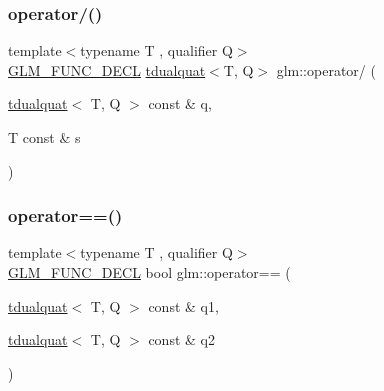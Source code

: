 \mbox{\label{group__gtx__dual__quaternion_gaac31fa68a57186cd22388eb385ca115d}} 
\subsubsection{\texorpdfstring{operator/()}{operator/()}}
{\footnotesize\ttfamily template$<$typename T , qualifier Q$>$ \\
\mbox{\hyperlink{setup_8hpp_ab2d052de21a70539923e9bcbf6e83a51}{G\+L\+M\+\_\+\+F\+U\+N\+C\+\_\+\+D\+E\+CL}} \mbox{\hyperlink{structglm_1_1tdualquat}{tdualquat}}$<$T, Q$>$ glm\+::operator/ (\begin{DoxyParamCaption}\item[{\mbox{\hyperlink{structglm_1_1tdualquat}{tdualquat}}$<$ T, Q $>$ const \&}]{q,  }\item[{T const \&}]{s }\end{DoxyParamCaption})}

\mbox{\label{group__gtx__dual__quaternion_ga82faf668287e9ca3c9751d873a85970d}} 
\subsubsection{\texorpdfstring{operator==()}{operator==()}}
{\footnotesize\ttfamily template$<$typename T , qualifier Q$>$ \\
\mbox{\hyperlink{setup_8hpp_ab2d052de21a70539923e9bcbf6e83a51}{G\+L\+M\+\_\+\+F\+U\+N\+C\+\_\+\+D\+E\+CL}} bool glm\+::operator== (\begin{DoxyParamCaption}\item[{\mbox{\hyperlink{structglm_1_1tdualquat}{tdualquat}}$<$ T, Q $>$ const \&}]{q1,  }\item[{\mbox{\hyperlink{structglm_1_1tdualquat}{tdualquat}}$<$ T, Q $>$ const \&}]{q2 }\end{DoxyParamCaption})}

